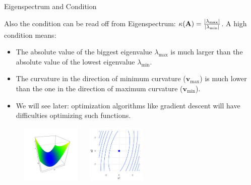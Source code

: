 \documentclass[11pt,compress,t,notes=noshow, xcolor=table]{beamer}
\begin{document}
  \begin{vbframe}{Eigenspectrum and Condition}
  
  Also the condition can be read off from Eigenspectrum: $\kappa(\mathbf{A}) = \frac{|\lambda_\text{max}|}{|\lambda_\text{min}|}$. A high condition means: 
  
  \begin{itemize}
    \item The absolute value of the biggest eigenvalue $\lambda_\text{max}$ is much larger than the absolute value of the lowest eigenvalue $\lambda_\text{min}$. 
    \item The curvature in the direction of minimum curvature ($\textbf{v}_\text{max}$) is much lower than the one in the direction of maximum curvature ($\textbf{v}_\text{min}$).
    \item We will see later: optimization algorithms like gradient descent will have difficulties optimizing such functions. 
  \end{itemize}
  
  \vspace*{-0.3cm}
  
  \begin{figure}
    \includegraphics[height=0.25\textwidth, width = 0.25\textwidth]{figure_man/quadratic_functions_2D_bad_cond_1.png} ~~ \includegraphics[height=0.25\textwidth, width = 0.25\textwidth]{figure_man/quadratic_functions_2D_bad_cond_2.png}\\
    \begin{footnotesize} 
    \end{footnotesize}
  \end{figure}
  
  
  \end{vbframe}
  
\end{document}
